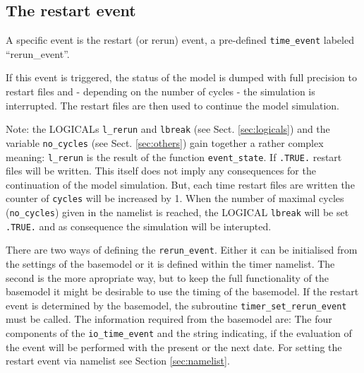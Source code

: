 \documentclass[twoside]{article}
\begin{document}
\subsection{The restart event\label{sec:restart}}
A specific event is the restart (or rerun) event, a pre-defined
\verb|time_event| labeled ``rerun\_event''.

If this event is triggered, the status of the model is dumped with full
precision to restart files and - depending on the number of cycles -
the simulation is interrupted. The restart files are then used to continue the
model simulation.

Note: the {\footnotesize LOGICAL}s \verb|l_rerun| and \verb|lbreak| 
(see Sect. \ref{sec:logicals})  and the variable \verb|no_cycles| 
(see Sect. \ref{sec:others}) gain together a rather complex meaning: 
\verb|l_rerun| is the result of the function
 \verb|event_state|. If \verb|.TRUE.| restart files will be written. This itself
does not imply any consequences for the continuation of the model simulation.
But, each time  restart files are written the counter of \verb|cycles| will be
increased by 1. When the number of maximal cycles (\verb|no_cycles|) given in 
 the namelist is reached, the {\footnotesize LOGICAL} \verb|lbreak| will be set
 \verb|.TRUE.| and as consequence the simulation will be interupted.

There are two ways of defining the \verb|rerun_event|. Either it can be 
initialised from the settings of the basemodel or it is defined within the timer
namelist. The second is the more apropriate way, but to keep the full 
functionality of the basemodel it might be desirable to use the timing of the
basemodel. If the restart event is determined by the basemodel, the subroutine
\verb|timer_set_rerun_event| must be called.
 The information required from the basemodel are:
The four components of the \verb|io_time_event| and the string indicating, if
the evaluation of the event will be performed with the present or the next
date.
For setting the restart event via namelist see Section \ref{sec:namelist}.

\end{document}

